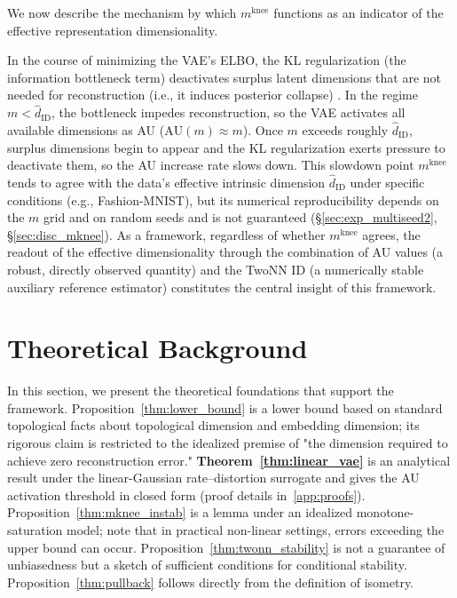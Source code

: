 \documentclass[make,article,submit,pdftex,moreauthors]{Definitions/mdpi}
\newcommand{\mknee}{m^{\mathrm{knee}}}
\begin{document}
We now describe the mechanism by which $\mknee$ functions as an indicator of the
effective representation dimensionality.

In the course of minimizing the VAE's ELBO, the KL regularization (the information
bottleneck term) deactivates surplus latent dimensions that are not needed for
reconstruction (i.e., it induces posterior collapse)
\cite{lucas2019elbo,higgins2017betavae}.
In the regime $m < \hat{d}_\mathrm{ID}$, the bottleneck impedes reconstruction, so the
VAE activates all available dimensions as AU ($\mathrm{AU}(m) \approx m$).
Once $m$ exceeds roughly $\hat{d}_\mathrm{ID}$, surplus dimensions begin to appear and
the KL regularization exerts pressure to deactivate them, so the AU increase rate
slows down.
This slowdown point $\mknee$ tends to agree with the data's effective intrinsic
dimension $\hat{d}_\mathrm{ID}$ under specific conditions (e.g., Fashion-MNIST),
but its numerical reproducibility depends on the $m$ grid and on random seeds
and is not guaranteed (§\ref{sec:exp_multiseed2}, §\ref{sec:disc_mknee}).
As a framework, regardless of whether $\mknee$ agrees, the readout of the
effective dimensionality through the combination of AU values (a robust, directly
observed quantity) and the TwoNN ID (a numerically stable auxiliary reference
estimator) constitutes the central insight of this framework.

\section{Theoretical Background}\label{sec:theory}

In this section, we present the theoretical foundations that support the framework.
Proposition~\ref{thm:lower_bound} is a lower bound based on standard topological facts
about topological dimension and embedding dimension; its rigorous claim is restricted to
the idealized premise of "the dimension required to achieve zero reconstruction error."
\textbf{Theorem~\ref{thm:linear_vae}} is an analytical result under the linear-Gaussian
rate--distortion surrogate and gives the AU activation threshold in closed form
(proof details in~\ref{app:proofs}).
Proposition~\ref{thm:mknee_instab} is a lemma under an idealized monotone-saturation model;
note that in practical non-linear settings, errors exceeding the upper bound can occur.
Proposition~\ref{thm:twonn_stability} is not a guarantee of unbiasedness but a sketch of
sufficient conditions for conditional stability.
Proposition~\ref{thm:pullback} follows directly from the definition of isometry.
\end{document}
